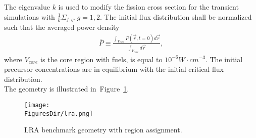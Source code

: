 \documentclass[12pt]{scrartcl}
\newcommand{\fig}[1]{Figure~\ref{#1}}                      %
\newcommand{\FiguresDir}{./figs}
\begin{document}
The eigenvalue $k$ is used to modify the fission cross section for the transient simulations with $\frac{1}{k}\Sigma_{f,g}, g=1,2$.  The initial flux distribution shall be normalized such that the averaged power density
\begin{align}
\bar{P} \equiv \frac{\int_{V_{core}} P(\vec{r}, t=0) d\vec{r}}{\int_{V_{core}} d\vec{r}},
\end{align}
where $V_{core}$ is the core region with fuels, is equal to $10^{-6} W\cdot cm^{-3}$.
The initial precursor concentrations are in equilibrium with the initial critical flux distribution.\\

The geometry is illustrated in~\fig{fig:lra-geometry}.\\
\begin{figure}[!htbp]
\centering
\texttt{[image: \\FiguresDir/lra.png]}
\caption{LRA benchmark geometry with region assignment.}
\label{fig:lra-geometry}
\end{figure}
\end{document}
